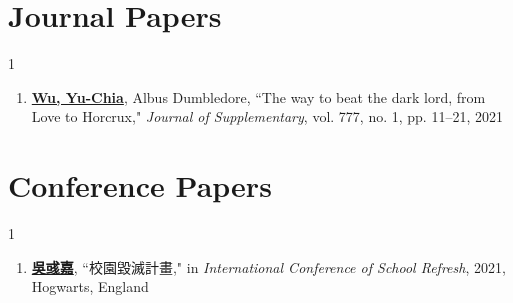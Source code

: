 \begin{publications}%


\section*{Journal Papers}
\begin{spacing}{1}
\begin{enumerate}

\item {\bf \underline{Wu, Yu-Chia}}, Albus Dumbledore, ``The way to beat the dark lord, from Love to Horcrux," \textit{Journal of Supplementary}, vol. 777, no. 1, pp. 11--21, 2021

\end{enumerate}
\end{spacing}


\section*{Conference Papers}
\begin{spacing}{1}
\begin{enumerate}

\item {\bf \underline{吳彧嘉}}, ``校園毀滅計畫," in \textit{International Conference of School Refresh}, 2021, Hogwarts, England

\end{enumerate}
\end{spacing}


\end{publications}